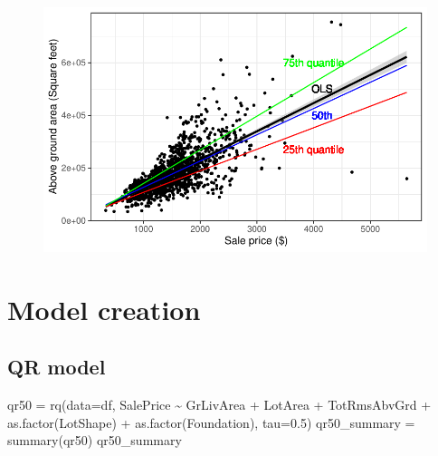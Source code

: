 \documentclass[
  letterpaper,
  DIV=11,
  numbers=noendperiod]{scrreprt}
\newenvironment{Shaded}{\begin{snugshade}}{\end{snugshade}}
\newcommand{\AttributeTok}[1]{\textcolor[rgb]{0.40,0.45,0.13}{#1}}
\newcommand{\FloatTok}[1]{\textcolor[rgb]{0.68,0.00,0.00}{#1}}
\newcommand{\FunctionTok}[1]{\textcolor[rgb]{0.28,0.35,0.67}{#1}}
\newcommand{\NormalTok}[1]{\textcolor[rgb]{0.00,0.23,0.31}{#1}}
\newcommand{\OtherTok}[1]{\textcolor[rgb]{0.00,0.23,0.31}{#1}}
\newcommand{\SpecialCharTok}[1]{\textcolor[rgb]{0.37,0.37,0.37}{#1}}
\begin{document}
\begin{figure}[H]

{\centering \includegraphics{analysis_files/figure-pdf/Visualizing housing-2.pdf}

}

\end{figure}

\hypertarget{model-creation}{%
\section{Model creation}\label{model-creation}}

\hypertarget{qr-model}{%
\subsection{QR model}\label{qr-model}}

\begin{Shaded}
\begin{Highlighting}[]
\NormalTok{qr50 }\OtherTok{=} \FunctionTok{rq}\NormalTok{(}\AttributeTok{data=}\NormalTok{df, SalePrice }\SpecialCharTok{\textasciitilde{}}\NormalTok{ GrLivArea }\SpecialCharTok{+}\NormalTok{ LotArea }\SpecialCharTok{+}\NormalTok{ TotRmsAbvGrd }\SpecialCharTok{+} \FunctionTok{as.factor}\NormalTok{(LotShape) }\SpecialCharTok{+} \FunctionTok{as.factor}\NormalTok{(Foundation), }\AttributeTok{tau=}\FloatTok{0.5}\NormalTok{)}
\NormalTok{qr50\_summary }\OtherTok{=} \FunctionTok{summary}\NormalTok{(qr50)}
\NormalTok{qr50\_summary}
\end{Highlighting}
\end{Shaded}
\end{document}
